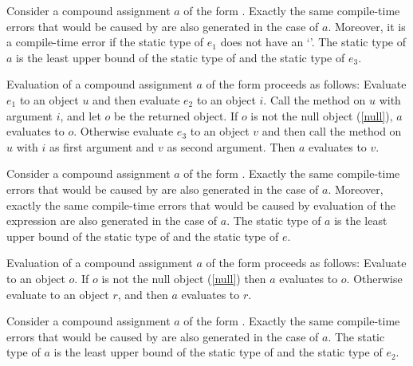 \documentclass[makeidx]{article}
\begin{document}
{\LMHash{}%
Consider a compound assignment $a$ of the form .
Exactly the same compile-time errors that would be caused by
are also generated in the case of $a$.
Moreover, it is a compile-time error
if the static type of $e_1$ does not have an `'.
The static type of $a$ is the least upper bound of
the static type of  and the static type of $e_3$.

\LMHash{}%
Evaluation of a compound assignment $a$ of the form
proceeds as follows:
Evaluate $e_1$ to an object $u$ and then evaluate $e_2$ to an object $i$.
Call the \code{[]} method on $u$ with argument $i$,
and let $o$ be the returned object.
If $o$ is not the null object (\ref{null}), $a$ evaluates to $o$.
Otherwise evaluate $e_3$ to an object $v$
and then call the \code{[]=} method on $u$
with $i$ as first argument and $v$ as second argument.
Then $a$ evaluates to $v$.
\EndCase

\LMHash{}%
Consider a compound assignment $a$ of the form .
Exactly the same compile-time errors that would be caused by
are also generated in the case of $a$.
Moreover, exactly the same compile-time errors that would be caused by
evaluation of the expression 
are also generated in the case of $a$.
The static type of $a$ is the least upper bound of
the static type of  and the static type of $e$.

\LMHash{}%
Evaluation of a compound assignment $a$ of the form 
proceeds as follows:
Evaluate  to an object $o$.
If $o$ is not the null object (\ref{null}) then $a$ evaluates to $o$.
Otherwise evaluate  to an object $r$,
and then $a$ evaluates to $r$.
\EndCase

\LMHash{}%
Consider a compound assignment $a$ of the form .
Exactly the same compile-time errors that would be caused by
are also generated in the case of $a$.
The static type of $a$ is the least upper bound of
the static type of  and the static type of $e_2$.

}
\end{document}
